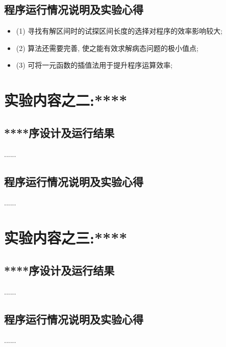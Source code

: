 \documentclass[12pt,a4paper]{ctexart}
\begin{document}
\subsection{程序运行情况说明及实验心得}
\begin{itemize}
  \item [](1) 寻找有解区间时的试探区间长度的选择对程序的效率影响较大;
  \item [](2) 算法还需要完善, 使之能有效求解病态问题的极小值点;
  \item [](3) 可将一元函数的插值法用于提升程序运算效率;
\end{itemize}


\section{实验内容之二:**** }
\subsection{****序设计及运行结果}
......
\subsection{程序运行情况说明及实验心得}
......

\section{实验内容之三:**** }
\subsection{****序设计及运行结果}
......
\subsection{程序运行情况说明及实验心得}
......
\end{document}
